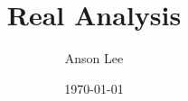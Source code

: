 \documentclass[11pt]{article}
\title{Real Analysis}
\author{Anson Lee}
\date{\today}
\begin{document}
\maketitle

\begin{problem}
\end{problem}

\begin{solution}
\end{solution}
\end{document}
